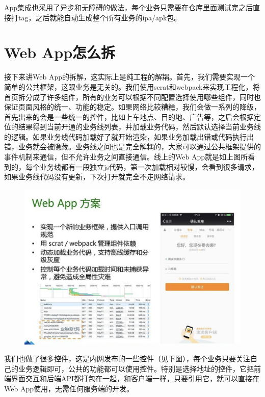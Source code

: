 \documentclass[12pt]{article}
\begin{document}
App集成也采用了异步和无障碍的做法，每个业务只需要在仓库里面测试完之后直接打tag，之后就能自动生成整个所有业务的ipa/apk包。

\section{Web App怎么拆}
接下来讲Web App的拆解，这实际上是纯工程的解耦。首先，我们需要实现一个简单的公共框架，这跟业务是无关的。我们使用scrat和webpack来实现工程化，将首页拆分成了许多组件，所有的业务可以根据不同配置选择使用哪些组件，同时也保证页面风格的统一、功能的稳定。如果网络比较糟糕，我们会做一系列的降级，首先出来的会是一些统一的控件，比如上车地点、目的地、广告等，之后会根据定位的结果得到当前开通的业务线列表，并加载业务代码，然后默认选择当前业务线的逻辑。如果业务线代码加载好了就开始渲染，如果业务加载出错或代码执行出错，业务就会被隐藏。业务线之间也是完全解耦的，大家可以通过公共框架提供的事件机制来通信，但不允许业务之间直接通信。线上的Web App就是如上图所看到的，每个业务线都有一段独立js代码，第一次加载相对较慢，会看到很多请求，如果业务线代码没有更新，下次打开就完全不走网络请求。

\begin{figure}[H]
    \centering
    \includegraphics[width=1\textwidth]{fig/DIDI_Reconstruction_16.png}
\end{figure}

我们也做了很多控件，这是内网发布的一些控件（见下图），每个业务只要关注自己的业务逻辑即可，公共的功能都可以使用控件。特别是选择地址的控件，它把前端界面交互和后端API都打包在一起，和客户端一样，只要引用它，就可以直接在Web App使用，无需任何服务端的开发。
\end{document}
